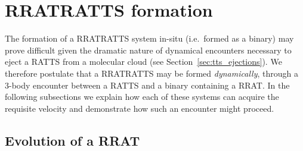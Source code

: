 \documentclass[twocolumn, twocolappendix]{aastex631}
\newcommand{\tauriRAT}{RATTS\xspace}
\newcommand{\radioRAT}{RRAT\xspace}
\newcommand{\binaryRAT}{RRATRATTS\xspace}
\begin{document}
\section{\binaryRAT{} formation}\label{sec:rat_formation}

The formation of a \binaryRAT system in-situ (i.e.\ formed as a binary) may prove difficult given the dramatic nature of dynamical encounters necessary to eject a \tauriRAT from a molecular cloud (see Section~\ref{sec:tts_ejections}). We therefore postulate that a \binaryRAT may be formed \textit{dynamically}, through a 3-body encounter between a \tauriRAT and a binary containing a \radioRAT. In the following subsections we explain how each of these systems can acquire the requisite velocity and demonstrate how such an encounter might proceed.

\subsection{Evolution of a \radioRAT}
\end{document}
